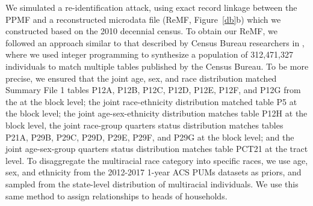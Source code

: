 \documentclass{article}
\begin{document}
We simulated a re-identification attack, using exact record linkage between the PPMF and a reconstructed microdata file (ReMF, Figure~\ref{db}b) which we constructed based on the 2010 decennial census. To obtain our ReMF, we followed an approach similar to that described by Census Bureau researchers in \cite{garfinkel2019understanding}, where we used integer programming to synthesize a population of 312,471,327 individuals to match multiple tables published by the Census Bureau. To be more precise, we ensured that the joint age, sex, and race distribution matched Summary File 1 tables P12A, P12B, P12C, P12D, P12E, P12F, and P12G from the  at the block level; the joint race-ethnicity distribution matched table P5 at the block level; the joint age-sex-ethnicity distribution matches table P12H at the block level, the joint race-group quarters status distribution matches tables P21A, P29B, P29C, P29D, P29E, P29F, and P29G at the block level; and the joint age-sex-group quarters status distribution matches table PCT21 at the tract level. To disaggregate the multiracial race category into specific races, we use age, sex, and ethnicity from the 2012-2017 1-year ACS PUMs datasets as priors, and sampled from the state-level distribution of multiracial individuals. We use this same method to assign relationships to heads of households.
\end{document}
